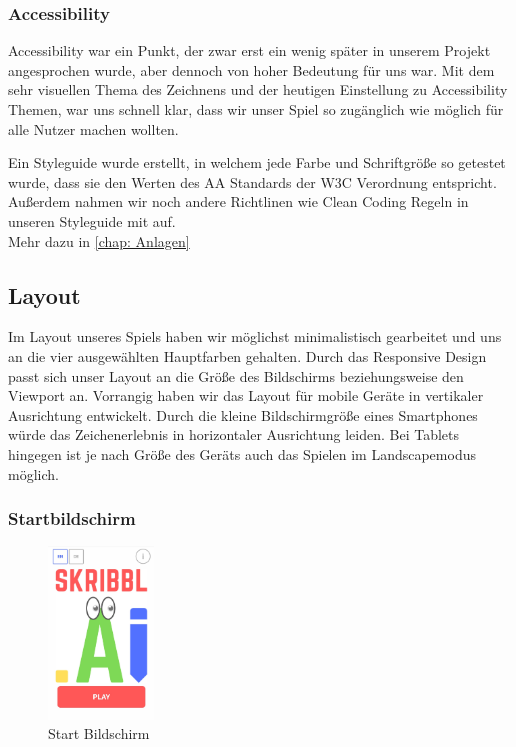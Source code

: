 \documentclass[11pt]{article}
\begin{document}
\subsubsection{Accessibility}

Accessibility war ein Punkt, der zwar erst ein wenig später in unserem Projekt angesprochen wurde, aber dennoch von hoher Bedeutung für uns war. Mit dem sehr visuellen Thema des Zeichnens und der heutigen Einstellung zu Accessibility Themen, war uns schnell klar, dass wir unser Spiel so zugänglich wie möglich für alle Nutzer machen wollten.

Ein Styleguide wurde erstellt, in welchem jede Farbe und Schriftgröße so getestet wurde, dass sie den Werten des AA Standards der W3C Verordnung entspricht. Außerdem nahmen wir noch andere Richtlinen wie Clean Coding Regeln in unseren Styleguide mit auf.\\
Mehr dazu in \autoref{chap: Anlagen} 

\subsection{Layout}
Im Layout unseres Spiels haben wir möglichst minimalistisch gearbeitet und uns an die vier ausgewählten Hauptfarben gehalten. Durch das Responsive Design passt sich unser Layout an die Größe des Bildschirms beziehungsweise den Viewport an. Vorrangig haben wir das Layout für mobile Geräte in vertikaler Ausrichtung entwickelt. Durch die kleine Bildschirmgröße eines Smartphones würde das Zeichenerlebnis in horizontaler Ausrichtung leiden. Bei Tablets hingegen ist je nach Größe des Geräts auch das Spielen im Landscapemodus möglich.

\subsubsection{Startbildschirm}

\begin{figure}
\centering
\includegraphics[width=0.25\textwidth]{images/Startscreen.jpg}
\caption{\label{fig:Startscreen}Start Bildschirm}
\end{figure}
\end{document}
